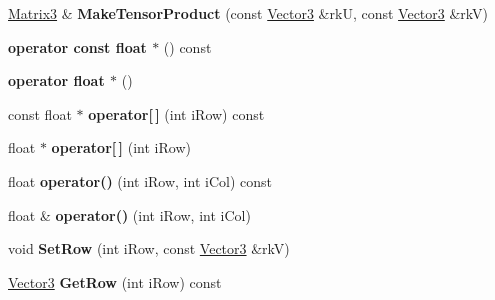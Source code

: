 \begin{DoxyCompactItemize}
\item 
\hyperlink{class_i_dream_sky_1_1_matrix3}{Matrix3} \& {\bfseries Make\+Tensor\+Product} (const \hyperlink{class_i_dream_sky_1_1_vector3}{Vector3} \&rkU, const \hyperlink{class_i_dream_sky_1_1_vector3}{Vector3} \&rkV)\hypertarget{class_i_dream_sky_1_1_matrix3_a4afbbb24447e4e37c883a3dbea034ec4}{}\label{class_i_dream_sky_1_1_matrix3_a4afbbb24447e4e37c883a3dbea034ec4}

\item 
{\bfseries operator const float $\ast$} () const \hypertarget{class_i_dream_sky_1_1_matrix3_ae9c99183f05c7ecd318b272034c31422}{}\label{class_i_dream_sky_1_1_matrix3_ae9c99183f05c7ecd318b272034c31422}

\item 
{\bfseries operator float $\ast$} ()\hypertarget{class_i_dream_sky_1_1_matrix3_ac71b5e1f1fb5a06ef1cea04717eac661}{}\label{class_i_dream_sky_1_1_matrix3_ac71b5e1f1fb5a06ef1cea04717eac661}

\item 
const float $\ast$ {\bfseries operator\mbox{[}$\,$\mbox{]}} (int i\+Row) const \hypertarget{class_i_dream_sky_1_1_matrix3_a6274ac392d2219c64b1e17fb6c0cca37}{}\label{class_i_dream_sky_1_1_matrix3_a6274ac392d2219c64b1e17fb6c0cca37}

\item 
float $\ast$ {\bfseries operator\mbox{[}$\,$\mbox{]}} (int i\+Row)\hypertarget{class_i_dream_sky_1_1_matrix3_ace39f6d27769c00bb6e41bc04f06d1aa}{}\label{class_i_dream_sky_1_1_matrix3_ace39f6d27769c00bb6e41bc04f06d1aa}

\item 
float {\bfseries operator()} (int i\+Row, int i\+Col) const \hypertarget{class_i_dream_sky_1_1_matrix3_ab2b8abdfb0b5d6194bedd4748f209dc4}{}\label{class_i_dream_sky_1_1_matrix3_ab2b8abdfb0b5d6194bedd4748f209dc4}

\item 
float \& {\bfseries operator()} (int i\+Row, int i\+Col)\hypertarget{class_i_dream_sky_1_1_matrix3_a5068d5f7b6d29860e2e1a61e1210ceaa}{}\label{class_i_dream_sky_1_1_matrix3_a5068d5f7b6d29860e2e1a61e1210ceaa}

\item 
void {\bfseries Set\+Row} (int i\+Row, const \hyperlink{class_i_dream_sky_1_1_vector3}{Vector3} \&rkV)\hypertarget{class_i_dream_sky_1_1_matrix3_a35339cc910678cb8d8fd006565bdb475}{}\label{class_i_dream_sky_1_1_matrix3_a35339cc910678cb8d8fd006565bdb475}

\item 
\hyperlink{class_i_dream_sky_1_1_vector3}{Vector3} {\bfseries Get\+Row} (int i\+Row) const \hypertarget{class_i_dream_sky_1_1_matrix3_a2998f2233e7c1213434c82fe5637be54}{}\label{class_i_dream_sky_1_1_matrix3_a2998f2233e7c1213434c82fe5637be54}


\end{DoxyCompactItemize}
